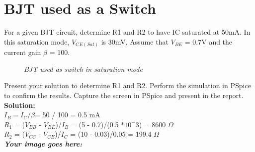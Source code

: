 \section{BJT used as a Switch}
For a given BJT circuit, determine R1 and R2 to have IC saturated at 50mA. In this saturation mode, $V_{CE(Sat)}$ is 30mV. Assume that $V_{BE}$ = 0.7V and the current gain $\beta$ = 100.

\begin{figure}[!htp]
    \centering
    \caption{\textit{BJT used as switch in saturation mode}}
    \label{bai3_manual_2}
\end{figure}

Present your solution to determine R1 and R2.
Perform the simulation in PSpice to confirm the results. Capture the screen in PSpice and present in the report.\\

\textbf{Solution:}\\
$I_B = I_C / \beta $= 50 / 100 = 0.5 mA \\
$R_1$ = ($V_{BB}$ - $V_{BE}$)/$I_B$ = (5 - 0.7)/(0.5 $* 10^-3$) = 8600 $\Omega$  \\
$R_2$ = ($V_{CC}$ - $V_{CE}$)/$I_C$ = (10 - 0.03)/0.05 = 199.4 $\Omega$ \\


\textbf{\textit{Your image goes here:}}\\
\vspace{6cm}